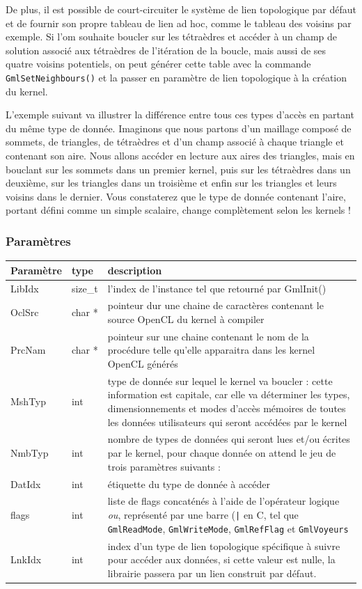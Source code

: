 \documentclass[a4paper,12pt]{article}
\begin{document}
De plus, il est possible de court-circuiter le système de lien topologique par défaut et de fournir son propre tableau de lien ad hoc, comme le tableau des voisins par exemple.
Si l'om souhaite boucler sur les tétraèdres et accéder à un champ de solution associé aux tétraèdres de l'itération de la boucle, mais aussi de ses quatre voisins potentiels, on peut générer cette table avec la commande {\tt GmlSetNeighbours()} et la passer en paramètre de lien topologique à la création du kernel.

L'exemple suivant va illustrer la différence entre tous ces types d'accès en partant du même type de donnée.
Imaginons que nous partons d'un maillage composé de sommets, de triangles, de tétraèdres et d'un champ associé à chaque triangle et contenant son aire. Nous allons accéder en lecture aux aires des triangles, mais en bouclant sur les sommets dans un premier kernel, puis sur les tétraèdres dans un deuxième, sur les triangles dans un troisième et enfin sur les triangles et leurs voisins dans le dernier. Vous constaterez que le type de donnée contenant l'aire, portant défini comme un simple scalaire, change complètement selon les kernels !

\subsubsection*{Paramètres}

\begin{tabular}{|m{2cm}|m{1.5cm}|m{10.5cm}|}
\hline
Paramètre  & type    & description \\
\hline
LibIdx     & size\_t & l'index de l'instance tel que retourné par GmlInit() \\
\hline
OclSrc     & char *  & pointeur dur une chaine de caractères contenant le source OpenCL du kernel à compiler \\
\hline
PrcNam     & char *  & pointeur sur une chaine contenant le nom de la procédure telle qu'elle apparaitra dans les kernel OpenCL générés \\
\hline
MshTyp     & int     & type de donnée sur lequel le kernel va boucler : cette information est capitale, car elle va déterminer les types, dimensionnements et modes d'accès mémoires de toutes les données utilisateurs qui seront accédées par le kernel \\
\hline
NmbTyp     & int     & nombre de types de données qui seront lues et/ou écrites par le kernel, pour chaque donnée on attend le jeu de trois paramètres suivants : \\
\hline
DatIdx     & int     & étiquette du type de donnée à accéder \\
\hline
flags      & int     & liste de flags concaténés à l'aide de l'opérateur logique \emph{ou}, représenté par une barre ({\tt |} en C, tel que {\tt GmlReadMode}, {\tt GmlWriteMode}, {\tt GmlRefFlag} et {\tt GmlVoyeurs} \\
\hline
LnkIdx     & int     & index d'un type de lien topologique spécifique à suivre pour accéder aux données, si cette valeur est nulle, la librairie passera par un lien construit par défaut. \\
\hline
\end{tabular}
\end{document}
